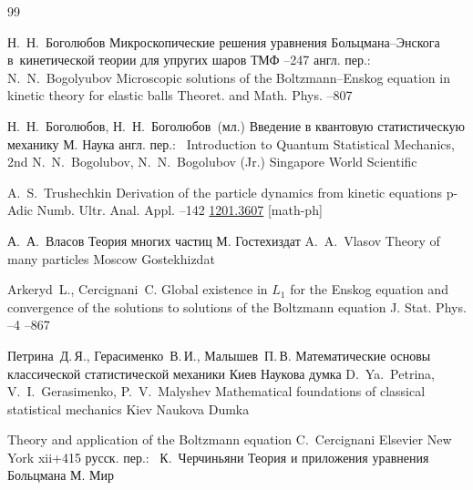 \begin{thebibliography}{99}

\by Н.~Н.~Боголюбов
\paper Микроскопические решения уравнения Больцмана--Энскога в~кинетической теории для упругих шаров
\jour ТМФ
--247
\transl англ. пер.:~
\by N.~N.~Bogolyubov
\paper Microscopic solutions of the Boltzmann--Enskog equation in kinetic theory for elastic balls
\jour Theoret. and Math. Phys.
--807

\by Н.~Н.~Боголюбов, Н.~Н.~Боголюбов~(мл.)
\book Введение в квантовую статистическую механику
\publaddr М.
\publ Наука
\transl англ. пер.:~
\book Introduction to Quantum Statistical Mechanics, 2nd
\by N.~N.~Bogolubov, N.~N.~Bogolubov (Jr.) 
\publaddr Singapore
\publ World Scientific



\by A.~S.~Trushechkin
\paper Derivation of the particle dynamics from kinetic equations 
\jour p-Adic Numb. Ultr. Anal. Appl.
  
--142
\arxiv 	\arxiv \href{http://arxiv.org/abs/1201.3607}{1201.3607} [math-ph]

\by А.~А.~Власов 
\book Теория многих частиц
\publaddr М. 
\publ Гостехиздат 
\misctransl 
\by A.~A.~Vlasov
\book Theory of many particles
\publaddr Moscow
\publ Gostekhizdat


\by Arkeryd~L., Cercignani~C.
\paper Global existence in $L_1$ for the Enskog equation and convergence of the solutions to solutions of the Boltzmann equation
\jour J. Stat. Phys. 
--4
--867

\by Петрина~Д.\,Я., Герасименко~В.\,И., Малышев~П.\,В.
\book Математические основы классической статистической механики
\publaddr Киев
\publ Наукова думка
\misctransl
\by D.~Ya.~Petrina, V.~I.~Gerasimenko, P.~V.~Malyshev
\book Mathematical foundations of classical statistical mechanics
\publaddr Kiev
\publ Naukova Dumka


\book Theory and application of the Boltzmann equation
\by C.~Cercignani
\publ Elsevier
\publaddr New York
\totalpages xii+415 
\rtransl русск. пер.:~
\by К.~Черчиньяни 
\book Теория и приложения уравнения Больцмана
\publaddr М.
\publ Мир


\end{thebibliography}
